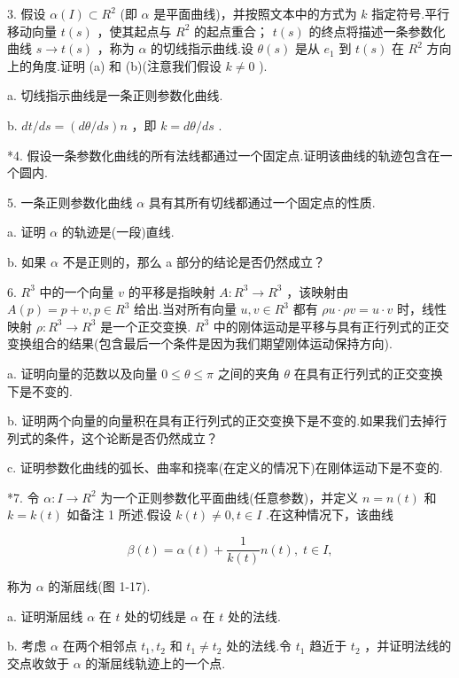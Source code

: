 3. 假设 \(\alpha \left( I\right)  \subset  {R}^{2}\) (即 \(\alpha\) 是平面曲线)，并按照文本中的方式为 \(k\) 指定符号.平行移动向量 \(t\left( s\right)\) ，使其起点与 \({R}^{2}\) 的起点重合； \(t\left( s\right)\) 的终点将描述一条参数化曲线 \(s \rightarrow  t\left( s\right)\) ，称为 \(\alpha\) 的切线指示曲线.设 \(\theta \left( s\right)\) 是从 \({e}_{1}\) 到 \(t\left( s\right)\) 在 \({R}^{2}\) 方向上的角度.证明 (a) 和 (b)(注意我们假设 \(k \neq  0\) ).

a. 切线指示曲线是一条正则参数化曲线.

b. \({dt}/{ds} = \left( {{d\theta }/{ds}}\right) n\) ，即 \(k = {d\theta }/{ds}\) .

*4. 假设一条参数化曲线的所有法线都通过一个固定点.证明该曲线的轨迹包含在一个圆内.

5. 一条正则参数化曲线 \(\alpha\) 具有其所有切线都通过一个固定点的性质.

a. 证明 \(\alpha\) 的轨迹是(一段)直线.

b. 如果 \(\alpha\) 不是正则的，那么 a 部分的结论是否仍然成立？

6. \({R}^{3}\) 中的一个向量 \(v\) 的平移是指映射 \(A : {R}^{3} \rightarrow  {R}^{3}\) ，该映射由 \(A\left( p\right)  = p + v,p \in  {R}^{3}\) 给出.当对所有向量 \(u,v \in  {R}^{3}\) 都有 \({\rho u} \cdot  {\rho v} = u \cdot  v\) 时，线性映射 \(\rho  : {R}^{3} \rightarrow  {R}^{3}\) 是一个正交变换. \({R}^{3}\) 中的刚体运动是平移与具有正行列式的正交变换组合的结果(包含最后一个条件是因为我们期望刚体运动保持方向).

a. 证明向量的范数以及向量 \(0 \leq  \theta  \leq  \pi\) 之间的夹角 \(\theta\) 在具有正行列式的正交变换下是不变的.

b. 证明两个向量的向量积在具有正行列式的正交变换下是不变的.如果我们去掉行列式的条件，这个论断是否仍然成立？

c. 证明参数化曲线的弧长、曲率和挠率(在定义的情况下)在刚体运动下是不变的.

*7. 令 \(\alpha  : I \rightarrow  {R}^{2}\) 为一个正则参数化平面曲线(任意参数)，并定义 \(n = n\left( t\right)\) 和 \(k = k\left( t\right)\) 如备注 1 所述.假设 \(k\left( t\right)  \neq  0,t \in  I\) .在这种情况下，该曲线

\[
\beta \left( t\right)  = \alpha \left( t\right)  + \frac{1}{k\left( t\right) }n\left( t\right) ,\;t \in  I,
\]

称为 \(\alpha\) 的渐屈线(图 1-17).

a. 证明渐屈线 \(\alpha\) 在 \(t\) 处的切线是 \(\alpha\) 在 \(t\) 处的法线.

b. 考虑 \(\alpha\) 在两个相邻点 \({t}_{1},{t}_{2}\) 和 \({t}_{1} \neq  {t}_{2}\) 处的法线.令 \({t}_{1}\) 趋近于 \({t}_{2}\) ，并证明法线的交点收敛于 \(\alpha\) 的渐屈线轨迹上的一个点.

